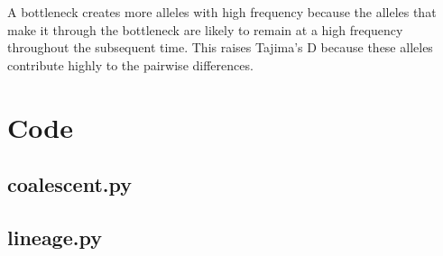\documentclass{article}
\begin{document}
A bottleneck creates more alleles with high frequency because the alleles that
make it through the bottleneck are likely to remain at a high frequency
throughout the subsequent time.  This raises Tajima's D because these alleles
contribute highly to the pairwise differences.

\section{Code}
\subsection{coalescent.py}

\subsection{lineage.py}

\end{document}
